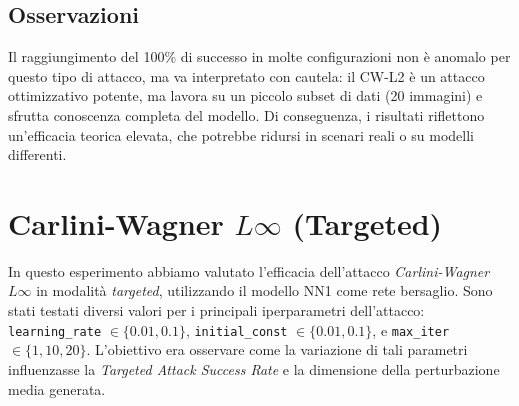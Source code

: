         \subsection{Osservazioni}
            Il raggiungimento del 100\% di successo in molte configurazioni non è anomalo per questo tipo di attacco, ma va interpretato con cautela: il CW-L2 è un attacco ottimizzativo potente, ma lavora su un piccolo subset di dati (20 immagini) e sfrutta conoscenza completa del modello. Di conseguenza, i risultati riflettono un'efficacia teorica elevata, che potrebbe ridursi in scenari reali o su modelli differenti.

    \section{Carlini-Wagner $L\infty$ (Targeted)}
        In questo esperimento abbiamo valutato l’efficacia dell’attacco \textit{Carlini-Wagner $L\infty$} in modalità \textit{targeted}, utilizzando il modello NN1 come rete bersaglio. Sono stati testati diversi valori per i principali iperparametri dell’attacco: \texttt{learning\_rate} $\in \{0.01, 0.1\}$, \texttt{initial\_const} $\in \{0.01, 0.1\}$, e \texttt{max\_iter} $\in \{1, 10, 20\}$. L’obiettivo era osservare come la variazione di tali parametri influenzasse la \textit{Targeted Attack Success Rate} e la dimensione della perturbazione media generata.
        
